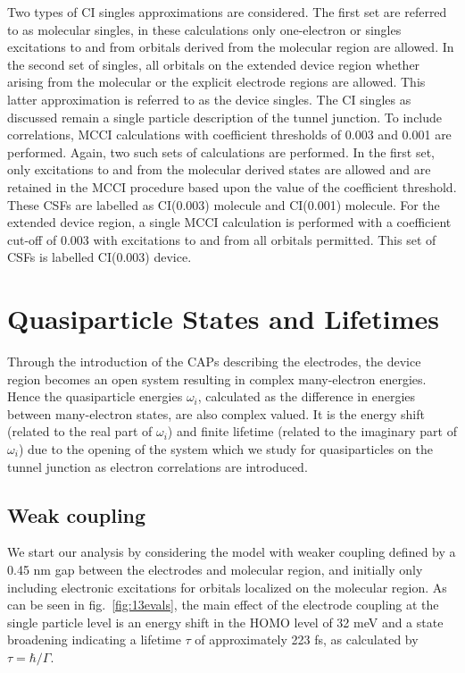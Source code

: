 Two types of CI singles approximations are considered. The first set are
referred to as molecular singles, in these calculations only one-electron
or singles excitations to and from orbitals derived from the molecular
region are allowed. In the second set of singles, all orbitals on the
extended device region whether arising from the molecular or the explicit
electrode regions are allowed. This latter approximation is referred to
as the device singles. The CI singles as discussed remain a single
particle description of the tunnel junction. To include correlations,
MCCI calculations with coefficient thresholds of 0.003 and 0.001 are
performed. Again, two such sets of calculations are performed. In the
first set, only excitations to and from the molecular derived states are
allowed and are retained in the MCCI procedure based upon the value of
the coefficient threshold. These CSFs are labelled as CI(0.003) molecule
and CI(0.001) molecule. For the extended device region, a single MCCI
calculation is performed with a coefficient cut-off of 0.003 with
excitations to and from all orbitals permitted. This set of CSFs is
labelled CI(0.003) device. 

\section{Quasiparticle States and Lifetimes}

Through the introduction of the \acp{CAP} describing the electrodes, the
device region becomes an open system resulting in complex many-electron
energies. Hence the quasiparticle energies $\omega_i$, calculated  as the
difference in energies between many-electron states, are also complex
valued. It is the energy shift (related to the real part of $\omega_i$)
and finite lifetime (related to the imaginary part of $\omega_i$) due to
the opening of the system which we study for quasiparticles on the
tunnel junction as electron correlations are introduced.

\subsection{Weak coupling}
We start our analysis by considering the model with weaker coupling
defined by a 0.45 nm gap between the electrodes and molecular region,
and initially only including electronic excitations for orbitals localized
on the molecular region. As can be seen in fig.~\ref{fig:13evals}, the
main effect of the electrode coupling at the single particle level is an
energy shift in the HOMO level of 32 meV and a state broadening indicating
a lifetime $\tau$ of approximately 223 fs, as calculated by
$\tau = \hbar / \Gamma$.

